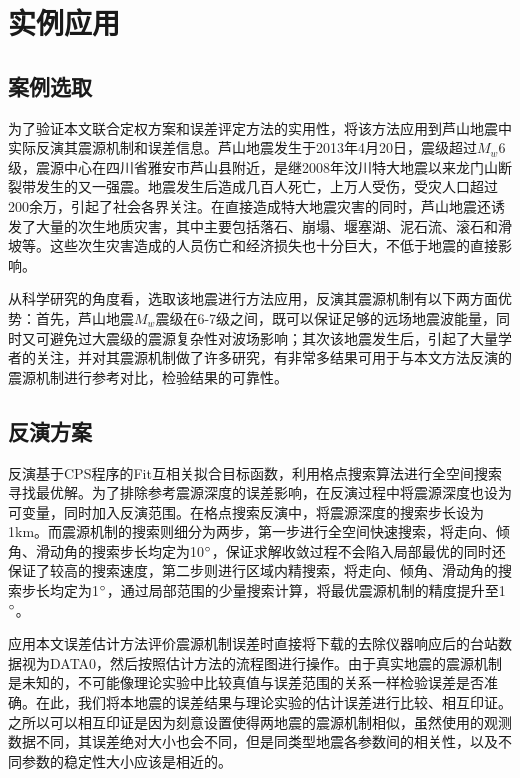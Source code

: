 

\chapter{实例应用}

\section{案例选取}

为了验证本文联合定权方案和误差评定方法的实用性，将该方法应用到芦山地震中实际反演其震源机制和误差信息。芦山地震发生于2013年4月20日，震级超过$M_w$6级，震源中心在四川省雅安市芦山县附近，是继2008年汶川特大地震以来龙门山断裂带发生的又一强震。地震发生后造成几百人死亡，上万人受伤，受灾人口超过200余万，引起了社会各界关注。在直接造成特大地震灾害的同时，芦山地震还诱发了大量的次生地质灾害，其中主要包括落石、崩塌、堰塞湖、泥石流、滚石和滑坡等。这些次生灾害造成的人员伤亡和经济损失也十分巨大，不低于地震的直接影响。

从科学研究的角度看，选取该地震进行方法应用，反演其震源机制有以下两方面优势：首先，芦山地震$M_w$震级在6-7级之间，既可以保证足够的远场地震波能量，同时又可避免过大震级的震源复杂性对波场影响；其次该地震发生后，引起了大量学者的关注，并对其震源机制做了许多研究，有非常多结果可用于与本文方法反演的震源机制进行参考对比，检验结果的可靠性。

\section{反演方案}
反演基于CPS程序的Fit互相关拟合目标函数，利用格点搜索算法进行全空间搜索寻找最优解。为了排除参考震源深度的误差影响，在反演过程中将震源深度也设为可变量，同时加入反演范围。在格点搜索反演中，将震源深度的搜索步长设为1km。而震源机制的搜索则细分为两步，第一步进行全空间快速搜索，将走向、倾角、滑动角的搜索步长均定为10$^\circ$，保证求解收敛过程不会陷入局部最优的同时还保证了较高的搜索速度，第二步则进行区域内精搜索，将走向、倾角、滑动角的搜索步长均定为1$^\circ$，通过局部范围的少量搜索计算，将最优震源机制的精度提升至1$^\circ$。

应用本文误差估计方法评价震源机制误差时直接将下载的去除仪器响应后的台站数据视为DATA0，然后按照估计方法的流程图进行操作。由于真实地震的震源机制是未知的，不可能像理论实验中比较真值与误差范围的关系一样检验误差是否准确。在此，我们将本地震的误差结果与理论实验的估计误差进行比较、相互印证。之所以可以相互印证是因为刻意设置使得两地震的震源机制相似，虽然使用的观测数据不同，其误差绝对大小也会不同，但是同类型地震各参数间的相关性，以及不同参数的稳定性大小应该是相近的。

